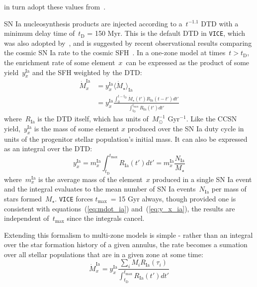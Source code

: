 \documentclass[fleqn, usenatbib]{mnras}
\newcommand{\ddfrac}[2]{\frac{\displaystyle #1}{\displaystyle #2}}
\newcommand{\refp}[1]{(\ref{#1})}
\begin{document}
in turn adopt these values from~\citet{Weinberg2017}. 
\par 
SN Ia nucleosynthesis products are injected according to a~$t^{-1.1}$ DTD with 
a minimum delay time of~$t_\text{D}$ = 150 Myr. This is the default DTD in 
\texttt{VICE}, which was also adopted by~\citet{Johnson2020}, and is suggested 
by recent observational results comparing the cosmic SN Ia rate to the cosmic 
SFH~\citep{Maoz2012, Maoz2017}. In a one-zone model at times~$t > t_\text{D}$, 
the enrichment rate of some element~$x$~can be expressed as the product of 
some yield~$y_x^\text{Ia}$ and the SFH weighted by the DTD: 
\begin{subequations}\begin{align} 
\dot{M}_x^\text{Ia} &= y_x^\text{Ia}\langle\dot{M}_\star\rangle_\text{Ia} \\ 
&= y_x^\text{Ia}\ddfrac{
	\int_0^{t - t_\text{D}} \dot{M}_\star(t') R_\text{Ia}(t - t') dt' 
}{
	\int_{t_\text{D}}^{t_\text{max}} R_\text{Ia}(t')dt' 
} 
\label{eq:mdot_ia} 
\end{align}\end{subequations} 
where~$R_\text{Ia}$ is the DTD itself, which has units of~$M_\odot^{-1}$ 
Gyr$^{-1}$. Like the CCSN yield,~$y_x^\text{Ia}$ is the mass of some element 
$x$ produced over the SN Ia duty cycle in units of the progenitor stellar 
population's initial mass. It can also be expressed as an integral over the 
DTD: 
\begin{equation} 
y_x^\text{Ia} = m_x^\text{Ia} \int_{t_\text{D}}^{t_\text{max}} R_\text{Ia}(t') 
dt' = m_x^\text{Ia}\frac{N_\text{Ia}}{M_\star} 
\label{eq:y_x_ia} 
\end{equation} 
where~$m_x^\text{Ia}$ is the average mass of the element~$x$ produced in a 
single SN Ia event and the integral evaluates to the mean number of SN Ia 
events~$N_\text{Ia}$ per mass of stars formed~$M_\star$. \texttt{VICE} forces 
$t_\text{max}$~= 15 Gyr always, though provided one is consistent with 
equations~\refp{eq:mdot_ia} and~\refp{eq:y_x_ia}, the results are independent 
of~$t_\text{max}$ since the integrals cancel. 
\par 
Extending this formalism to multi-zone models is simple - rather than an 
integral over the star formation history of a given annulus, the rate becomes 
a sumation over all stellar populations that are in a given zone at some time: 
\begin{equation} 
\dot{M}_x^\text{Ia} = y_x^\text{Ia} \ddfrac{
	\sum_i M_i R_\text{Ia}(\tau_i) 
}{
	\int_{t_\text{D}}^{t_\text{max}} R_\text{Ia}(t')dt' 
} 
\label{eq:mdot_ia_multizone} 
\end{equation} 
\end{document}

